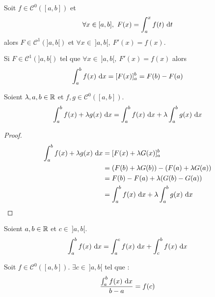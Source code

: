 \begin{theorem}
	Soit $f \in \mathcal{C}^0([a, b])$ et 
	\begin{align*}
		\forall x \in [a, b],\ F(x) = \int_a^x f(t) \ \diffd t
	\end{align*}
	alors $F \in \mathcal{C}^1(]a, b[)$ et $\forall x \in \ ]a, b[,\ F'(x) = f(x)$.    
\end{theorem}

\begin{corollary}
    Si $F \in \mathcal{C}^1(]a, b[)$ tel que $\forall x \in \ ]a, b[,\ F'(x) = f(x)$ alors
	\begin{align*}
		\int_a^b f(x) \ \diffd x = [F(x)]_a^b = F(b) - F(a) 
	\end{align*}
\end{corollary}

\begin{proposition}
	Soient $\lambda, a, b \in \mathbb{R}$ et $f, g \in \mathcal{C}^0([a, b])$.
	\begin{align*}
		\int_a^b f(x) + \lambda g(x) \ \diffd x = \int_a^b f(x) \ \diffd x + \lambda \int_a^b g(x) \ \diffd x 
	\end{align*}
\end{proposition}

\begin{proof}
    \begin{align*}
        \int_{a}^{b} f(x) + \lambda g(x) \ \diffd x &= [F(x) + \lambda G(x)]_a^b \\
                                                    &= (F(b) + \lambda G(b)) - (F(a) + \lambda G(a)) \\
                                                    &= F(b) - F(a) + \lambda (G(b) - G(a)) \\
                                                    &= \int_{a}^{b} f(x) \ \diffd x + \lambda \int_{a}^{b} g(x) \ \diffd x
    \end{align*}
\end{proof}

\begin{proposition}
	Soient $a, b \in \mathbb{R}$ et $c \in \ ]a, b[$.
	\begin{align*}
		\int_a^b f(x) \ \diffd x = \int_a^c f(x) \ \diffd x + \int_c^b f(x) \ \diffd x
	\end{align*}
\end{proposition}

\begin{theorem}
    Soit $f \in \mathcal{C}^0([a, b])$. $\exists c \in \ ]a, b[$  tel que :
    \[ \frac{\int_{a}^{b} f(x) \ \diffd x}{b - a} = f(c) \]
\end{theorem}

